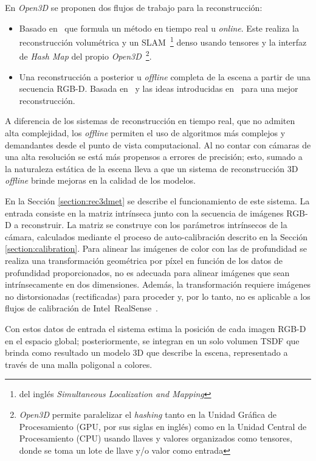 {En \textit{Open3D} se proponen dos flujos de trabajo para la reconstrucción:

\begin{itemize}
	\item Basado en~\cite{dong2022ash} que formula un método en tiempo real u \textit{online}. Este realiza la reconstrucción volumétrica y un SLAM~\footnote{del inglés \textit{Simultaneous Localization and Mapping}} denso usando tensores y la interfaz de \textit{Hash Map} del propio \textit{Open3D}~\footnote{\textit{Open3D} permite paralelizar el \textit{hashing} tanto en la Unidad Gráfica de Procesamiento (GPU, por sus siglas en inglés) como en la Unidad Central de Procesamiento (CPU) usando llaves y valores organizados como tensores, donde se toma un lote de llave y/o valor como entrada}.
	\item Una reconstrucción a posterior u \textit{offline} completa de la escena a partir de una secuencia RGB-D. Basada en~\cite{choi2015robust} y las ideas introducidas en~\cite{park2017colored} para una mejor reconstrucción.
\end{itemize}

A diferencia de los sistemas de reconstrucción en tiempo real, que no admiten alta complejidad, los \textit{offline} permiten el uso de algoritmos más complejos y demandantes desde el punto de vista computacional. Al no contar con cámaras de una alta resolución se está más propensos a errores de precisión; esto, sumado a la naturaleza estática de la escena lleva a que un sistema de reconstrucción 3D \textit{offline} brinde mejoras en la calidad de los modelos.

En la Sección \ref{section:rec3dmet} se describe el funcionamiento de este sistema. La entrada consiste en la matriz intrínseca junto con la secuencia de imágenes RGB-D a reconstruir. La matriz se construye con los parámetros intrínsecos de la cámara, calculados mediante el proceso de auto-calibración descrito en la Sección \ref{section:calibration}. Para alinear las imágenes de color con las de profundidad se realiza una transformación geométrica por píxel en función de los datos de profundidad proporcionados, no es adecuada para alinear imágenes que sean intrínsecamente en dos dimensiones. Además, la transformación requiere imágenes no distorsionadas (rectificadas) para proceder y, por lo tanto, no es aplicable a los flujos de calibración de Intel\textregistered~RealSense\texttrademark~.

Con estos datos de entrada el sistema estima la posición de cada imagen RGB-D en el espacio global; posteriormente, se integran en un solo volumen TSDF que brinda como resultado un modelo 3D que describe la escena, representado a través de una malla poligonal a colores.

}
